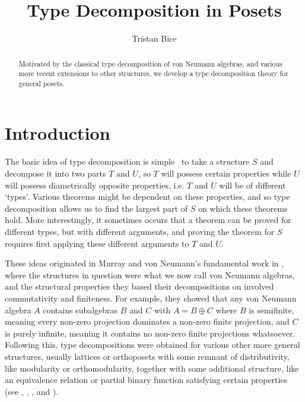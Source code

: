 \documentclass{amsart}
\author{Tristan Bice}
\theoremstyle{definition}
\numberwithin{equation}{section}
\begin{document}
\title{Type Decomposition in Posets}

\begin{abstract}
Motivated by the classical type decomposition of von Neumann algebras, and various more recent extensions to other structures, we develop a type decomposition theory for general posets.
\end{abstract}

\maketitle

\section{Introduction}

The basic idea of type decomposition is simple \textendash\, to take a structure $S$ and decompose it into two parts $T$ and $U$, so $T$ will possess certain properties while $U$ will possess diametrically opposite properties, i.e. $T$ and $U$ will be of different `types'.  Various theorems might be dependent on these properties, and so type decomposition allows us to find the largest part of $S$ on which these theorems hold.  More interestingly, it sometimes occurs that a theorem can be proved for different types, but with different arguments, and proving the theorem for $S$ requires first applying these different arguments to $T$ and $U$.

These ideas originated in Murray and von Neumann's fundamental work in \cite{MurrayvonNemann1936}, where the structures in question were what we now call von Neumann algebras, and the structural properties they based their decompositions on involved commutativity and finiteness.  For example, they showed that any von Neumann algebra $A$ contains subalgebras $B$ and $C$ with $A=B\oplus C$ where $B$ is semifinite, meaning every non-zero projection dominates a non-zero finite projection, and $C$ is purely infinite, meaning it contains no non-zero finite projections whatsoever.  Following this, type decompositions were obtained for various other more general structures, usually lattices or orthoposets with some remnant of distributivity, like modularity or orthomodularity, together with some additional structure, like an equivalence relation or partial binary function satisfying certain properties (see \cite{Loomis1955}, \cite{Kaplansky1955}, \cite{MaedaF1959}, \cite{GoodearlWehrung2005} and \cite{FoulisPulmannova2013}).
\end{document}
